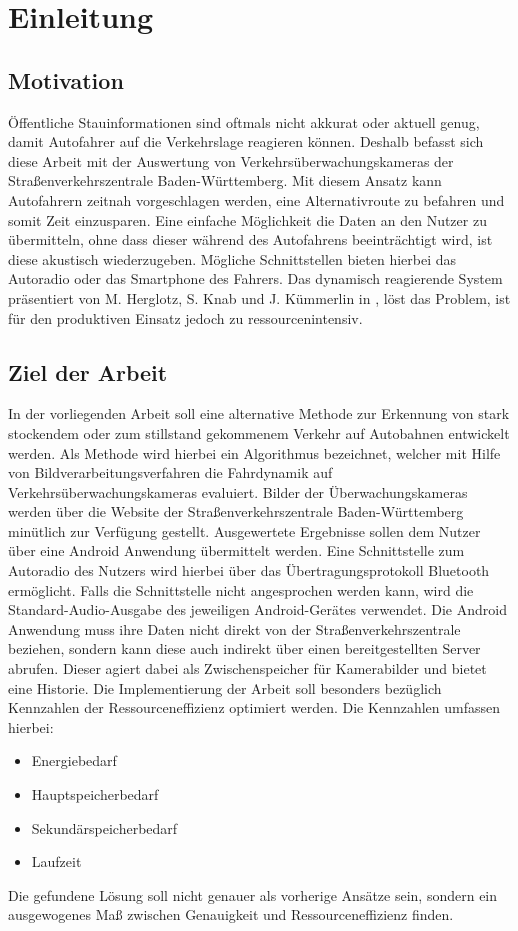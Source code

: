 \chapter{Einleitung}
\label{cha:Einleitung}

\section{Motivation}
\label{sec:Motivation}
Öffentliche Stauinformationen sind oftmals nicht akkurat oder aktuell genug, damit Autofahrer auf die Verkehrslage reagieren können. Deshalb befasst sich diese Arbeit mit der Auswertung von Verkehrsüberwachungskameras der Straßenverkehrszentrale Baden-Württemberg.
Mit diesem Ansatz kann Autofahrern zeitnah vorgeschlagen werden, eine Alternativroute zu befahren und somit Zeit einzusparen.
Eine einfache Möglichkeit die Daten an den Nutzer zu übermitteln, ohne dass dieser während des Autofahrens beeinträchtigt wird, ist diese akustisch wiederzugeben.
Mögliche Schnittstellen bieten hierbei das Autoradio oder das Smartphone des Fahrers.
Das dynamisch reagierende System präsentiert von M. Herglotz, S. Knab und J. Kümmerlin in \cite{hkkDhbw}, löst das Problem, ist für den produktiven Einsatz jedoch zu ressourcenintensiv.

\section{Ziel der Arbeit}
\label{sec:ZielDerArbeit}
In der vorliegenden Arbeit soll eine alternative Methode zur Erkennung von stark stockendem oder zum stillstand gekommenem Verkehr auf Autobahnen entwickelt werden. 
Als Methode wird hierbei ein Algorithmus bezeichnet, welcher mit Hilfe von Bildverarbeitungsverfahren die Fahrdynamik auf Verkehrsüberwachungskameras evaluiert.
Bilder der Überwachungskameras werden über die Website der Straßenverkehrszentrale Baden-Württemberg minütlich zur Verfügung gestellt. 
Ausgewertete Ergebnisse sollen dem Nutzer über eine Android Anwendung übermittelt werden. Eine Schnittstelle zum Autoradio des Nutzers wird hierbei über das Übertragungsprotokoll Bluetooth ermöglicht. Falls die Schnittstelle nicht angesprochen werden kann, wird die Standard-Audio-Ausgabe des jeweiligen Android-Gerätes verwendet.
Die Android Anwendung muss ihre Daten nicht direkt von der Straßenverkehrszentrale beziehen, sondern kann diese auch indirekt über einen bereitgestellten Server abrufen.
Dieser agiert dabei als Zwischenspeicher für Kamerabilder und bietet eine Historie.
Die Implementierung der Arbeit soll besonders bezüglich Kennzahlen der Ressourceneffizienz optimiert werden.
Die Kennzahlen umfassen hierbei:
\begin{itemize}
\item{Energiebedarf}
\item{Hauptspeicherbedarf}
\item{Sekundärspeicherbedarf}
\item{Laufzeit}
\end{itemize}
Die gefundene Lösung soll nicht genauer als vorherige Ansätze sein, sondern ein ausgewogenes Maß zwischen Genauigkeit und Ressourceneffizienz finden.

